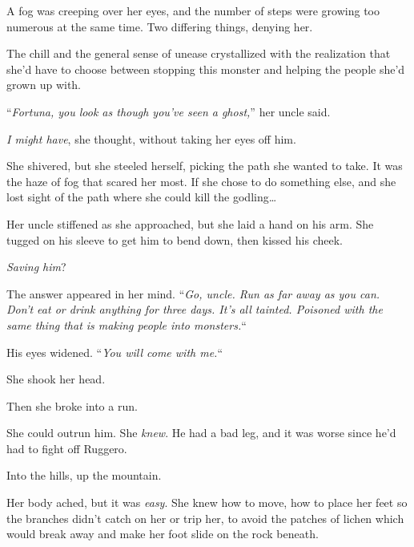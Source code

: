 A fog was creeping over her eyes, and the number of steps were growing too numerous at the same time.  Two differing things, denying her.



The chill and the general sense of unease crystallized with the realization that she'd have to choose between stopping this monster and helping the people she'd grown up with.



``\emph{Fortuna, you look as though you've seen a ghost,}'' her uncle said.



\emph{I might have}, she thought, without taking her eyes off him.



She shivered, but she steeled herself, picking the path she wanted to take.  It was the haze of fog that scared her most.  If she chose to do something else, and she lost sight of the path where she could kill the godling\ldots



Her uncle stiffened as she approached, but she laid a hand on his arm.  She tugged on his sleeve to get him to bend down, then kissed his cheek.



\emph{Saving him}?



The answer appeared in her mind.  ``\emph{Go, uncle.  Run as far away as you can.  Don't eat or drink anything for three days.  It's all tainted.  Poisoned with the same thing that is making people into monsters.}``



His eyes widened.  ``\emph{You will come with me.}``



She shook her head.



Then she broke into a run.



She could outrun him.  She \emph{knew}.  He had a bad leg, and it was worse since he'd had to fight off Ruggero.



Into the hills, up the mountain.



Her body ached, but it was \emph{easy}.  She knew how to move, how to place her feet so the branches didn't catch on her or trip her, to avoid the patches of lichen which would break away and make her foot slide on the rock beneath.



